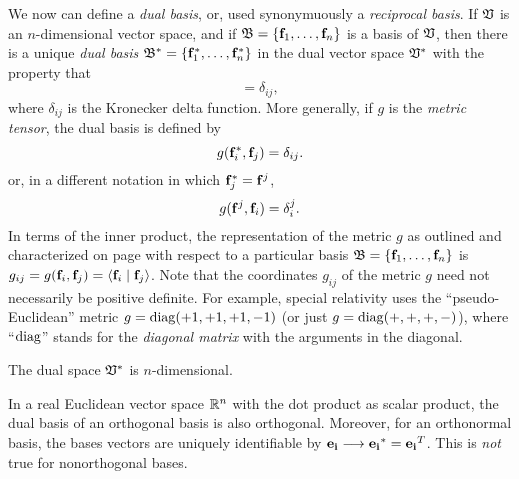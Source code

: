 We now can define a {\em dual basis}, or, used synonymuously a {\em reciprocal basis}.
If ${\frak V}$ is an $n$-dimensional vector space, and if
${\frak B} = \{{\bf f}_1,\ldots , {\bf f}_n\}$
is a basis of  ${\frak V}$,
then there is a unique {\em dual basis}
${\frak B}^*
=\{{\bf f}_1^*,\ldots , {\bf f}_n^*\}$ in the dual vector space ${\frak V}^*$
with the property that
\begin{equation}
[f_i^* , f_j]=\delta_{ij},
\label{2011-m-Dualbasis-e1}
\end{equation}
where  $\delta_{ij}$
is the Kronecker delta function.
More generally, if $g$ is the {\em metric tensor},
the dual basis is defined by
\begin{equation}
g( {\bf f}_i^*,{\bf f}_j)=\delta_{ij}.
\label{2011-m-Dualbasis-e2}
\end{equation}
or, in a different notation in which ${\bf f}_j^* = {\bf f}^j$,
\begin{equation}
g( {\bf f}^j,{\bf f}_i)=\delta_{i}^j.
\label{2011-m-Dualbasis-e3}
\end{equation}
In terms of the inner product, the representation
of the metric $g$ as outlined and characterized on page \pageref{2011-m-metrict} with respect to a particular basis
${\frak B} = \{{\bf f}_1,\ldots , {\bf f}_n\}$
is $g_{ij}=g({\bf f}_i,{\bf f}_j)=\langle {\bf f}_i\mid {\bf f}_j\rangle$.
Note that the coordinates $g_{ij}$ of
the metric $g$ need not necessarily be positive definite.
For example,  special relativity uses the ``pseudo-Euclidean'' metric
 $g={\rm diag}(+1,+1,+1,-1)$ (or just $g={\rm diag}(+,+,+,-)$), where ``${\rm diag}$''
stands for the {\em diagonal matrix}
with the arguments in the diagonal.


The dual space  ${\frak V}^*$  is $n$-dimensional.

In a real Euclidean vector space ${\Bbb R}^n$
with the dot product as scalar product,
the dual basis of an orthogonal basis  is also orthogonal.
Moreover, for an orthonormal basis, the bases vectors are uniquely identifiable by
${\bf e_i} \longrightarrow {\bf e_i}^* = {\bf e_i}^T$.
This is {\em not} true for nonorthogonal bases.

